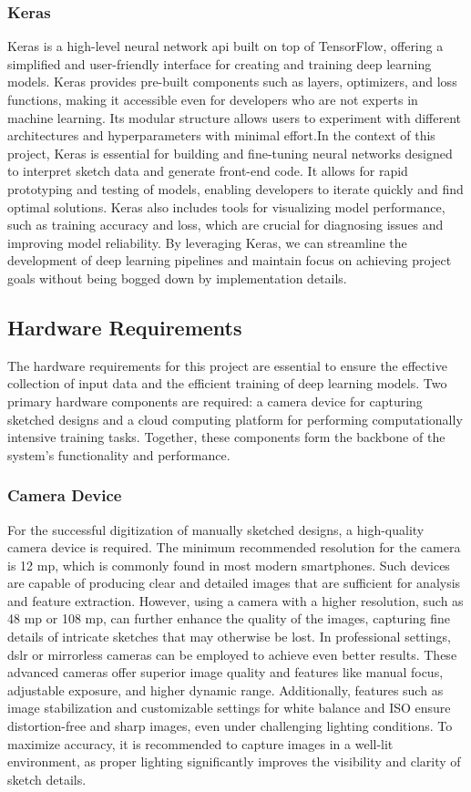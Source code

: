 \subsubsection{Keras}
Keras is a high-level neural network \gls{api} built on top of TensorFlow, offering a simplified and user-friendly interface for creating and training deep learning models. Keras provides pre-built components such as layers, optimizers, and loss functions, making it accessible even for developers who are not experts in machine learning. Its modular structure allows users to experiment with different architectures and hyperparameters with minimal effort.In the context of this project, Keras is essential for building and fine-tuning neural networks designed to interpret sketch data and generate front-end code. It allows for rapid prototyping and testing of models, enabling developers to iterate quickly and find optimal solutions. Keras also includes tools for visualizing model performance, such as training accuracy and loss, which are crucial for diagnosing issues and improving model reliability. By leveraging Keras, we can streamline the development of deep learning pipelines and maintain focus on achieving project goals without being bogged down by implementation details.
\pagebreak
\subsection{Hardware Requirements}  
The hardware requirements for this project are essential to ensure the effective collection of input data and the efficient training of deep learning models. Two primary hardware components are required: a camera device for capturing sketched designs and a cloud computing platform for performing computationally intensive training tasks. Together, these components form the backbone of the system's functionality and performance.  

\subsubsection{Camera Device}  
For the successful digitization of manually sketched designs, a high-quality camera device is required. The minimum recommended resolution for the camera is 12 \gls{mp}, which is commonly found in most modern smartphones. Such devices are capable of producing clear and detailed images that are sufficient for analysis and feature extraction. However, using a camera with a higher resolution, such as 48 \gls{mp} or 108 \gls{mp}, can further enhance the quality of the images, capturing fine details of intricate sketches that may otherwise be lost. In professional settings, \gls{dslr} or mirrorless cameras can be employed to achieve even better results. These advanced cameras offer superior image quality and features like manual focus, adjustable exposure, and higher dynamic range. Additionally, features such as image stabilization and customizable settings for white balance and ISO ensure distortion-free and sharp images, even under challenging lighting conditions. To maximize accuracy, it is recommended to capture images in a well-lit environment, as proper lighting significantly improves the visibility and clarity of sketch details.  

